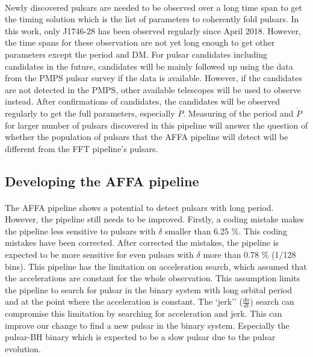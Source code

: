 \documentclass[../chapter1/thesis_msc.tex]{subfiles}
\begin{document}
\paragraph{} Newly discovered pulsars are needed to be observed over a long time span to get the timing solution which is the list of parameters to coherently fold pulsars. In this work, only J1746-28 has been observed regularly since April 2018. However, the time spans for these observation are not yet long enough to get other parameters except the period and DM. For pulsar candidates including candidates in the future, candidates will be mainly followed up using the data from the PMPS pulsar survey if the data is available. However, if the candidates are not detected in the PMPS, other available telescopes will be used to observe instead. After confirmations of candidates, the candidates will be observed regularly to get the full parameters, especially $\dot{P}$. Measuring of the period and $\dot{P}$ for larger number of pulsars discovered in this pipeline will answer the question of whether the population of pulsars that the AFFA pipeline will detect will be different from the FFT pipeline's pulsars.   
\subsection{Developing the AFFA pipeline}
\paragraph{} The AFFA pipeline shows a potential to detect pulsars with long period. However, the pipeline still needs to be improved. Firstly, a coding mistake makes the pipeline less sensitive to pulsars with $\delta$ smaller than 6.25 \%. This coding mistakes have been corrected. After corrected the mistakes, the pipeline is expected to be more sensitive for even pulsars with  $\delta$ more than 0.78 \% (1/128 bins).  This pipeline has the limitation on acceleration search, which assumed that the accelerations are constant for the whole observation. This assumption limits the pipeline to search for pulsar in the binary system with long orbital period and at the point where the acceleration is constant. The `jerk'' ($\frac{da}{dt}$) search can compromise this limitation by searching for acceleration and jerk. This can improve our change to find a new pulsar in the binary system. Especially the pulsar-BH binary which is expected to be a slow pulsar due to the pulsar evolution.      
\end{document}
